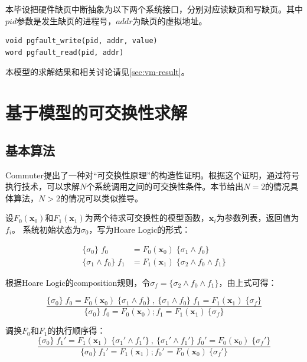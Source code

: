 本毕设把硬件缺页中断抽象为以下两个系统接口，分别对应读缺页和写缺页。其中$pid$参数是发生缺页的进程号，$addr$为缺页的虚拟地址。

\begin{lstlisting}
void pgfault_write(pid, addr, value)
word pgfault_read(pid, addr)
\end{lstlisting}

本模型的求解结果和相关讨论请见\ref{sec:vm-result}。

\section{基于模型的可交换性求解}

\subsection{基本算法}
\label{subsec:comm-alg}
Commuter\cite{commuter:2013}提出了一种对``可交换性原理''的构造性证明。根据这个证明，通过符号执行技术，可以求解$N$个系统调用之间的可交换性条件。本节给出$N=2$的情况具体算法，$N
> 2$的情况可以类似推导。

设$F_0(\boldsymbol{x}_0)$和$F_1(\boldsymbol{x}_1)$为两个待求可交换性的模型函数，$\boldsymbol{x}_i$为参数列表，返回值为$f_i$。
系统初始状态为$\sigma_0$，写为Hoare Logic\cite{Hoare:1969:ABC:363235.363259}的形式：

\begin{equation}
\label{eq:hoare1}
\begin{aligned}
\{ \sigma_0 \} \; f_0 &= F_0(\boldsymbol{x}_0) \; \{\sigma_1 \land f_0 \} \\
\{ \sigma_1 \land f_0 \} \; f_1 &= F_1(\boldsymbol{x}_1) \; \{\sigma_2 \land f_0 \land
	f_1 \}
\end{aligned}
\end{equation}

根据Hoare Logic的composition规则，令$\sigma_f = \{\sigma_2 \land f_0 \land
	f_1 \}$，由上式可得：

\begin{equation}
\label{eq:hoare2}
\frac
{ \{ \sigma_0 \} \; f_0 = F_0(\boldsymbol{x}_0) \; \{\sigma_1 \land f_0 \}\ , \
\{ \sigma_1 \land f_0 \} \; f_1 = F_1(\boldsymbol{x}_1) \; \{ \sigma_f \} }
{\{ \sigma_0 \}\ f_0 = F_0(\boldsymbol{x}_0);f_1 = F_1(\boldsymbol{x}_1) \ \{ \sigma_f
\}}
\end{equation}

调换$F_0$和$F_1$的执行顺序得：
\begin{equation}
\label{eq:hoare3}
\frac
{ \{ \sigma_0 \} \; f_1' = F_1(\boldsymbol{x}_1) \; \{\sigma_1' \land f_1' \}\ , \
\{ \sigma_1' \land f_1' \} \; f_0' = F_0(\boldsymbol{x}_0) \; \{ \sigma_f' \} }
{\{ \sigma_0 \}\ f_1' = F_1(\boldsymbol{x}_1);f_0' = F_0(\boldsymbol{x}_0) \
\{ \sigma_f' \}}
\end{equation}

